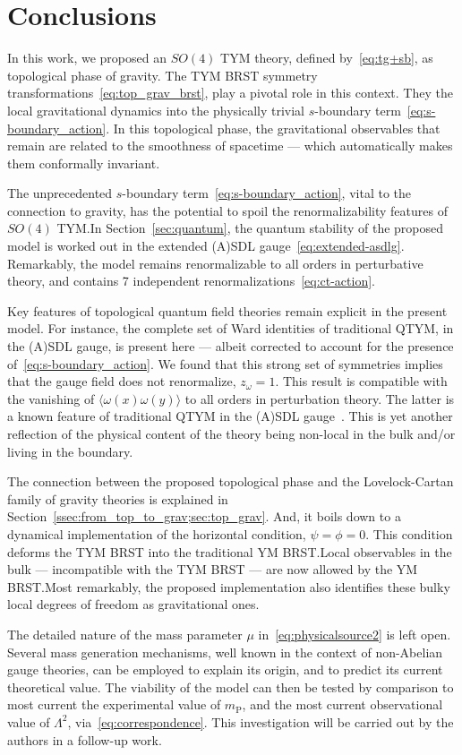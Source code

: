 \documentclass[../main.tex]{subfiles}
\begin{document}
\section{Conclusions}%
\label{sec:conclusions}

In this work, we proposed an $ SO \left( 4 \right) $ TYM theory, defined by~\eqref{eq:tg+sb}, as topological phase of gravity. The TYM BRST symmetry transformations~\eqref{eq:top_grav_brst}, play a pivotal role in this context. They  the local gravitational dynamics into the physically trivial $s$-boundary term~\eqref{eq:s-boundary_action}. In this topological phase, the gravitational observables that remain are related to the smoothness of spacetime --- which automatically makes them conformally invariant.

The unprecedented $ s $-boundary term~\eqref{eq:s-boundary_action}, vital to the connection to gravity, has the potential to spoil the renormalizability features of $ SO(4) $ TYM.\@ In Section~\ref{sec:quantum}, the quantum stability of the proposed model is worked out in the extended (A){}SDL gauge~\eqref{eq:extended-asdlg}. Remarkably, the model remains renormalizable to all orders in perturbative theory, and contains 7 independent renormalizations~\eqref{eq:ct-action}.

Key features of topological quantum field theories remain explicit in the present model. For instance, the complete set of Ward identities of traditional QTYM, in the (A){}SDL gauge, is present here --- albeit corrected to account for the presence of~\eqref{eq:s-boundary_action}. We found that this strong set of symmetries implies that the gauge field does not renormalize, $ z_{ \omega } = 1 $. This result is compatible with the vanishing of $ \langle \omega(x) \omega(y) \rangle $ to all orders in perturbation theory. The latter is a known feature of traditional QTYM in the (A){}SDL gauge~\cite{sadovski2017c,sadovski2018a}. This is yet another reflection of the physical content of the theory being non-local in the bulk and/or living in the boundary.

The connection between the proposed topological phase and the Lovelock-Cartan family of gravity theories is explained in Section~\ref{ssec:from_top_to_grav;sec:top_grav}. And, it boils down to a dynamical implementation of the horizontal condition, $ \psi = \phi = 0 $. This condition deforms the TYM BRST into the traditional YM BRST.\@ Local observables in the bulk --- incompatible with the TYM BRST --- are now allowed by the YM BRST.\@ Most remarkably, the proposed implementation also identifies these bulky local degrees of freedom as gravitational ones.

The detailed nature of the mass parameter $ \mu $ in~\eqref{eq:physicalsource2} is left open. Several mass generation mechanisms, well known in the context of non-Abelian gauge theories, can be employed to explain its origin, and to predict its current theoretical value. The viability of the model can then be tested by comparison to most current the experimental value of $ m_{ \text{P} } $, and the most current observational value of $ \Lambda^2 $, via~\eqref{eq:correspondence}. This investigation will be carried out by the authors in a follow-up work.
\end{document}
